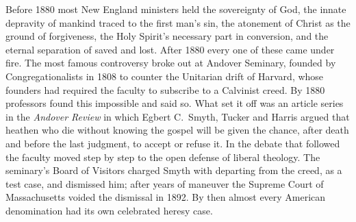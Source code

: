 Before 1880 most New England ministers held the sovereignty of God, the innate depravity of mankind
traced to the first man's sin, the atonement of Christ as the ground of forgiveness, the Holy Spirit's necessary part in conversion, and the eternal separation of saved and lost. After 1880 every one of
these came under fire. The most famous controversy broke out at Andover Seminary, founded by
Congregationalists in 1808 to counter the Unitarian drift of Harvard, whose founders had required
the faculty to subscribe to a Calvinist creed. By 1880 professors found this impossible and said so.
What set it off was an article series in the \emph{Andover Review} in which Egbert C.~Smyth, Tucker and
Harris argued that heathen who die without knowing the gospel will be given the chance, after death and before the last judgment, to accept or refuse it. In the debate that followed the faculty moved
step by step to the open defense of liberal theology. The seminary's Board of Visitors charged Smyth with
departing from the creed, as a test case, and dismissed him; after years of maneuver the Supreme
Court of Massachusetts voided the dismissal in 1892. By then almost every American denomination had
its own celebrated heresy case.

\begin{keyfacts}
\end{keyfacts}
